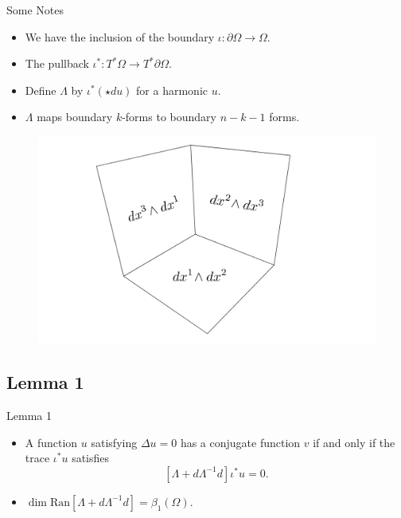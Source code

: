 \documentclass[aspectratio=169]{beamer}
\begin{document}
\begin{frame}{Some Notes}
    \vfill
    \begin{itemize}
    \pause
    \item We have the inclusion of the boundary $\iota \colon \partial \Omega \to \Omega$.
    
    \pause
    \item The pullback $\iota^* \colon T^*\Omega \to T^*\partial \Omega$.
    
    \pause
    \item Define $\Lambda$ by $\iota^*(\star d u)$ for a harmonic $u$.
    
    \pause
    \item $\Lambda$ maps boundary $k$-forms to boundary $n-k-1$ forms.
    \end{itemize}
\end{frame}

\begin{frame}{}
\begin{figure}[H]
    \centering
	\includegraphics[width=.8\columnwidth]{2forms.png}
\end{figure}
\vfill
\end{frame}

\subsection{Lemma 1}

\begin{frame}{Lemma 1}
\vfill
        \begin{itemize}
            \pause
            \item A function $u$ satisfying $\Delta u =0$ has a conjugate function $v$ if and only if the trace $\iota^* u$ satisfies
            \[
                \left[ \Lambda + d\Lambda^{-1} d\right] \iota^*u = 0.
            \]
            
            \pause
            \item $\dim\textrm{Ran}\left[ \Lambda + d \Lambda^{-1} d \right] = \beta_1(\Omega).$
        \end{itemize}
        \vfill
\end{frame}
\end{document}
